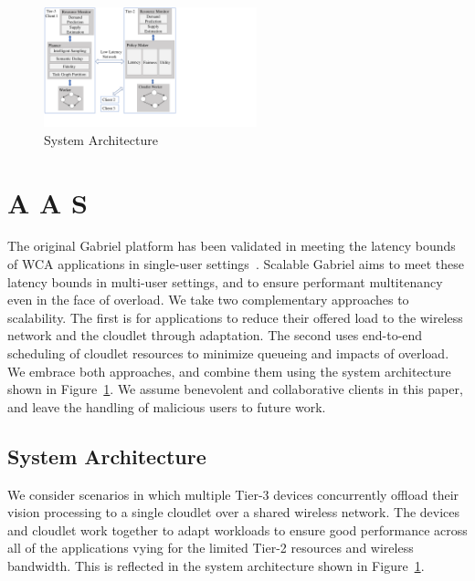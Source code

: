 \begin{figure}
\centering
\includegraphics[width=0.55\textwidth,trim=0 3em 11cm 0, clip]{FIGS/arch-vertical.pdf}
\caption{\small System Architecture}
\label{fig:arch}
\vspace{-0.2in}
\end{figure}


\section{A   A S}
\label{sec:arch}
 

The original Gabriel platform has been validated in meeting the
latency bounds of WCA applications in single-user
settings~\cite{chen2017empirical}.  Scalable Gabriel aims to meet these latency
bounds in multi-user settings, and to ensure performant multitenancy
even in the face of overload.  We take two complementary approaches to
scalability.  The first is for applications to reduce their offered
load to the wireless network and the cloudlet through adaptation.  The
second uses end-to-end scheduling of cloudlet resources to minimize
queueing and impacts of overload.  We embrace both approaches, and
combine them using the system architecture shown in
Figure~\ref{fig:arch}.  We assume benevolent and collaborative clients
in this paper, and leave the handling of malicious users to future work.

\subsection{System Architecture}

We consider scenarios in which multiple Tier-3 devices concurrently
offload their vision processing to a single cloudlet over a shared
wireless network.  The devices and cloudlet work together to adapt
workloads to ensure good performance across all of the applications
vying for the limited Tier-2 resources and wireless bandwidth.  This
is reflected in the system architecture shown in
Figure~\ref{fig:arch}.

